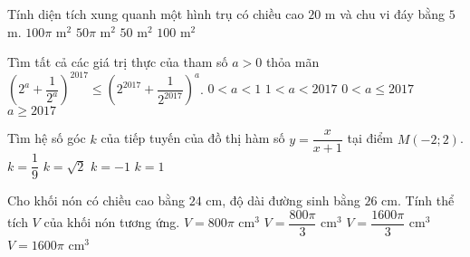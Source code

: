 \begin{ex}%
Tính diện tích xung quanh một hình trụ có chiều cao $20$ m và chu vi đáy bằng $5$ m.
\choice
{$100\pi$ m$^{2}$}
{$50\pi$ m$^{2}$}
{$50$ m$^{2}$}
{\True $100$ m$^{2}$}
\end{ex}
\begin{ex}%
Tìm tất cả các giá trị thực của tham số $a>0$ thỏa mãn $\left(2^{a}+\dfrac{1}{2^{a}}\right)^{2017}\leq \left(2^{2017}+\dfrac{1}{2^{2017}}\right)^{a}$.
\choice
{$0<a<1$}
{$1<a<2017$}
{$0<a\leq 2017$}
{\True $a\geq 2017$}
\end{ex}
\begin{ex}%
Tìm hệ số góc $k$ của tiếp tuyến của đồ thị hàm số $y=\dfrac{x}{x+1}$ tại điểm $M(-2;2)$.
\choice
{$k=\dfrac{1}{9}$}
{$k=\sqrt{2}$}
{$k=-1$}
{\True $k=1$}
\end{ex}
\begin{ex}%
Cho khối nón có chiều cao bằng $24$ cm, độ dài đường sinh bằng $26$ cm. Tính thể tích $V$ của khối nón tương ứng.
\choice
{\True $V=800\pi$ cm$^{3}$}
{$V=\dfrac{800\pi}{3}$ cm$^{3}$}
{$V=\dfrac{1600\pi}{3}$ cm$^{3}$}
{$V=1600\pi$ cm$^{3}$}
\end{ex}
